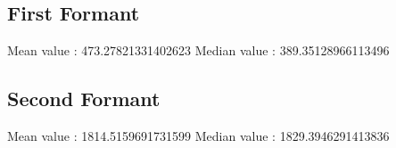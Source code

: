 \documentclass{article}%
\begin{document}
%
\subsection{First Formant}%
\label{subsec:FirstFormant}%
Mean value : 473.27821331402623%
\newline%
Median value : 389.35128966113496

%
\subsection{Second Formant}%
\label{subsec:SecondFormant}%
Mean value : 1814.5159691731599%
\newline%
Median value : 1829.3946291413836

%
\end{document}
